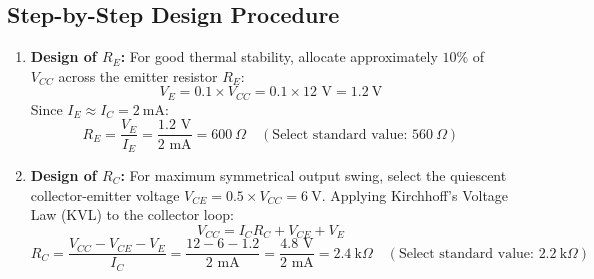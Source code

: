 \subsection{Step-by-Step Design Procedure}
\begin{enumerate}
	\item \textbf{Design of $R_E$:} For good thermal stability, allocate approximately $10\%$ of $V_{CC}$ across the emitter resistor $R_E$:
	\begin{equation}
		V_E = 0.1 \times V_{CC} = 0.1 \times 12\text{ V} = \SI{1.2}{\volt}
	\end{equation}
	Since $I_E \approx I_C = \SI{2}{\milli\ampere}$:
	\begin{equation}
		R_E = \frac{V_E}{I_E} = \frac{1.2\text{ V}}{2\text{ mA}} = \SI{600}{\Omega} \quad (\text{Select standard value: } \SI{560}{\Omega})
	\end{equation}
	
	\item \textbf{Design of $R_C$:} For maximum symmetrical output swing, select the quiescent collector-emitter voltage $V_{CE} = 0.5 \times V_{CC} = \SI{6}{\volt}$. Applying Kirchhoff's Voltage Law (KVL) to the collector loop:
	\begin{equation}
		V_{CC} = I_C R_C + V_{CE} + V_E
	\end{equation}
	\begin{equation}
		R_C = \frac{V_{CC} - V_{CE} - V_E}{I_C} = \frac{12 - 6 - 1.2}{2\text{ mA}} = \frac{4.8\text{ V}}{2\text{ mA}} = \SI{2.4}{\kilo\Omega} \quad (\text{Select standard value: } \SI{2.2}{\kilo\Omega})
	\end{equation}
	

\end{enumerate}
